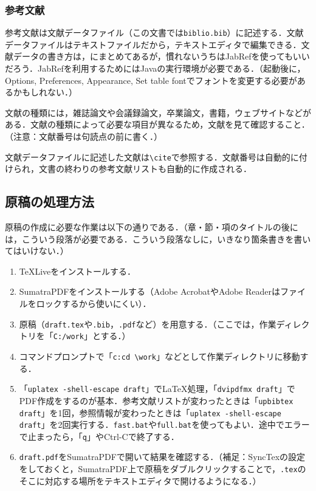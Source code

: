 \documentclass[uplatex,twocolumn,dvipdfmx]{jsarticle}
\begin{document}
\subsubsection{参考文献}\label{参考文献}

参考文献は文献データファイル（この文書では\verb|biblio.bib|）に記述する．文献データファイルはテキストファイルだから，テキストエディタで編集できる．文献データの書き方は，\cite{参考文献リストの書き方}にまとめてあるが，慣れないうちはJabRefを使ってもいいだろう．JabRefを利用するためにはJavaの実行環境が必要である．（起動後に，Options, Preferences, Appearance, Set table fontでフォントを変更する必要があるかもしれない．）

文献の種類には，雑誌論文\cite{yabuki2011}や会議録論文\cite{数式処理システムの性能評価}，卒業論文\cite{kubo2014}，書籍\cite{okumura2013}，ウェブサイト\cite{文章チェックリスト}などがある．文献の種類によって必要な項目が異なるため，文献\cite{参考文献リストの書き方}を見て確認すること．（注意：文献番号は句読点の前に書く．）

文献データファイルに記述した文献は\verb|\cite|で参照する．文献番号は自動的に付けられ，文書の終わりの参考文献リストも自動的に作成される．

\subsection{原稿の処理方法}

原稿の作成に必要な作業は以下の通りである．（章・節・項のタイトルの後には，こういう段落が必要である．こういう段落なしに，いきなり箇条書きを書いてはいけない．）

\begin{enumerate}
\item TeXLiveをインストールする．
\item SumatraPDFをインストールする（Adobe AcrobatやAdobe Readerはファイルをロックするから使いにくい）．
\item 原稿（\verb|draft.tex|や\verb|.bib|，\verb|.pdf|など）を用意する．（ここでは，作業ディレクトリを「\verb|C:/work|」とする．）
\item コマンドプロンプトで「\verb|c:|\verb|cd \work|」などとして作業ディレクトリに移動する．
\item 「\verb|uplatex -shell-escape draft|」で\LaTeX 処理，「\verb|dvipdfmx draft|」でPDF作成をするのが基本．参考文献リストが変わったときは「\verb|upbibtex draft|」を1回，参照情報が変わったときは「\verb|uplatex -shell-escape draft|」を2回実行する．\verb|fast.bat|や\verb|full.bat|を使ってもよい．途中でエラーで止まったら，「\verb|q|」やCtrl-Cで終了する．
\item \verb|draft.pdf|をSumatraPDFで開いて結果を確認する．（補足：SyncTexの設定をしておくと，SumatraPDF上で原稿をダブルクリックすることで，\verb|.tex|のそこに対応する場所をテキストエディタで開けるようになる．）
\end{enumerate}
\end{document}
